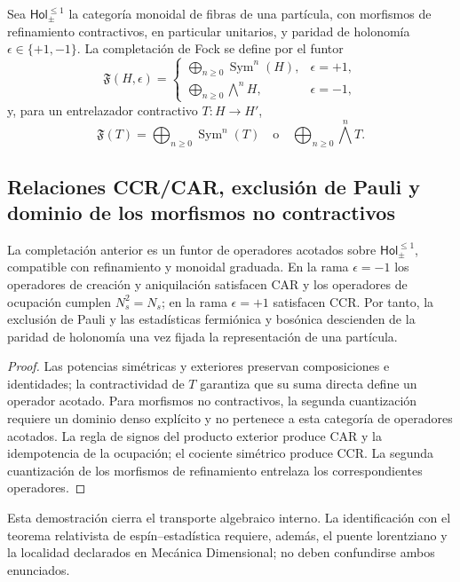 Sea \(\mathsf{Hol}_{\pm}^{\leq1}\) la categoría monoidal de fibras de una
partícula, con morfismos de refinamiento contractivos, en particular unitarios,
y paridad de holonomía
\(\epsilon\in\{+1,-1\}\). La completación de Fock se define por el funtor
\[
 \mathfrak F(H,\epsilon)=
 \begin{cases}
 \displaystyle\bigoplus_{n\ge0}\operatorname{Sym}^n(H),
     &\epsilon=+1,\\[2mm]
 \displaystyle\bigoplus_{n\ge0}\bigwedge^n\!H,
     &\epsilon=-1,
 \end{cases}
\]
y, para un entrelazador contractivo \(T:H\to H'\),
\[
 \mathfrak F(T)=
 \bigoplus_{n\ge0}\operatorname{Sym}^n(T)
 \quad\text{o}\quad
 \bigoplus_{n\ge0}\bigwedge^n\!T.
\]

\subsection{Relaciones CCR/CAR, exclusión de Pauli y dominio de los morfismos no contractivos}

\begin{theorem}
La completación anterior es un funtor de operadores acotados sobre
\(\mathsf{Hol}_{\pm}^{\leq1}\), compatible con refinamiento y
monoidal graduada. En la rama \(\epsilon=-1\) los operadores de creación y
aniquilación satisfacen CAR y los operadores de ocupación cumplen
\(N_s^2=N_s\); en la rama \(\epsilon=+1\) satisfacen CCR. Por tanto, la
exclusión de Pauli y las estadísticas fermiónica y bosónica descienden de la
paridad de holonomía una vez fijada la representación de una partícula.
\end{theorem}

\begin{proof}
Las potencias simétricas y exteriores preservan composiciones e identidades;
la contractividad de \(T\) garantiza que su suma directa define un operador
acotado. Para morfismos no contractivos, la segunda cuantización requiere un
dominio denso explícito y no pertenece a esta categoría de operadores acotados.
La regla de signos del producto exterior produce CAR y la idempotencia de la
ocupación; el cociente simétrico produce CCR. La segunda cuantización de los
morfismos de refinamiento entrelaza los correspondientes operadores.
\end{proof}

Esta demostración cierra el transporte algebraico interno. La identificación
con el teorema relativista de espín--estadística requiere, además, el puente
lorentziano y la localidad declarados en Mecánica Dimensional; no deben
confundirse ambos enunciados.

